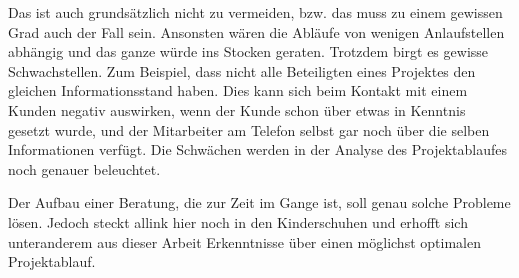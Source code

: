 Das ist auch grundsätzlich nicht zu vermeiden, bzw. das muss zu einem gewissen
Grad auch der Fall sein. Ansonsten wären die Abläufe von wenigen Anlaufstellen abhängig
und das ganze würde ins Stocken geraten. Trotzdem birgt es gewisse Schwachstellen.
Zum Beispiel, dass nicht alle Beteiligten eines Projektes den gleichen Informationsstand 
haben. Dies kann sich beim Kontakt mit einem Kunden negativ auswirken, wenn der
Kunde schon über etwas in Kenntnis gesetzt wurde, und der Mitarbeiter am
Telefon selbst gar noch über die selben Informationen verfügt. Die Schwächen 
werden in der Analyse des Projektablaufes noch genauer beleuchtet.

Der Aufbau einer Beratung, die zur Zeit im Gange ist, soll genau solche Probleme
lösen. Jedoch steckt allink hier noch in den Kinderschuhen und erhofft sich
unteranderem aus dieser Arbeit Erkenntnisse über einen möglichst optimalen 
Projektablauf.
